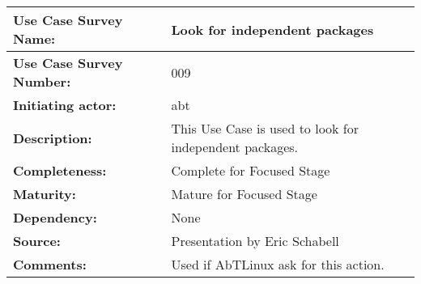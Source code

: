 \begin{tabularx}{\linewidth}{|l|X|}
\hline
\textbf{Use Case Survey Name:} & \textbf{Look for independent packages} \\
\hline
\textbf{Use Case Survey Number:} & 009 \\
\hline
\textbf{Initiating actor:} & abt \\
\hline
\textbf{Description:} & This Use Case is used to look for independent packages.\\
\hline
\textbf{Completeness:} & Complete for Focused Stage \\
\hline
\textbf{Maturity:} & Mature for Focused Stage \\
\hline
\textbf{Dependency:} & None\\
\hline
\textbf{Source:} & Presentation by Eric Schabell \\
\hline
\textbf{Comments:} & Used if AbTLinux ask for this action. \\
\hline
\end{tabularx}
 